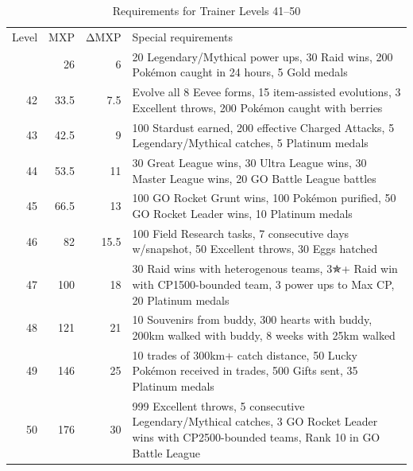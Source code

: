 \begin{table}[ht]
\begin{center}
  \begin{tabular}{r r r p{}}
Level & MXP & ΔMXP & Special requirements \\
\Midrule
41 & 26 & 6 & 20 Legendary/Mythical power ups,
                      30 Raid wins,
                      200 Pokémon caught in 24 hours,
                      5 Gold medals\\
42 & 33.5 & 7.5 & Evolve all 8 Eevee forms,
                      15 item-assisted evolutions,
                      3 Excellent throws,
                      200 Pokémon caught with berries \\
43 & 42.5 & 9 & 100 Stardust earned,
                      200 effective Charged Attacks,
                      5 Legendary/Mythical catches,
                      5 Platinum medals \\
44 & 53.5 & 11 & 30 Great League wins,
                       30 Ultra League wins,
                       30 Master League wins,
                       20 GO Battle League battles \\
45 & 66.5 & 13 & 100 GO Rocket Grunt wins,
                       100 Pokémon purified,
                       50 GO Rocket Leader wins,
                       10 Platinum medals\\
46 & 82 & 15.5 & 100 Field Research tasks,
                       7 consecutive days w/snapshot,
                       50 Excellent throws,
                       30 Eggs hatched\\
47 & 100 & 18 & 30 Raid wins with heterogenous teams,
                        3{\symbolfont ✯}+ Raid win with CP1500-bounded team,
                        3 power ups to Max CP,
                        20 Platinum medals\\
48 & 121 & 21 & 10 Souvenirs from buddy,
                        300 hearts with buddy,
                        200km walked with buddy,
                        8 weeks with 25km walked\\
49 & 146 & 25 & 10 trades of 300km+ catch distance,
                        50 Lucky Pokémon received in trades,
                        500 Gifts sent,
                        35 Platinum medals\\
50 & 176 & 30 & 999 Excellent throws,
                        5 consecutive Legendary/Mythical catches,
                        3 GO Rocket Leader wins with CP2500-bounded teams,
                        Rank 10 in GO Battle League\\
\end{tabular}
\caption{Requirements for Trainer Levels 41--50}
\label{table:xp41plus}
\end{center}
\end{table}
